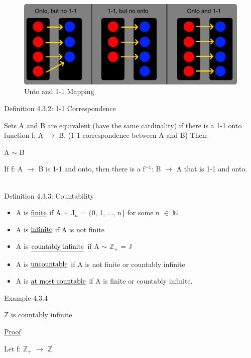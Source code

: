 \begin{figure}[h]
	\centering
	\includegraphics[scale=0.25]{Images/4.3.1.png}
	\caption{Unto and 1-1 Mapping}
\end{figure}

{ \color{blue} Definition  4.3.2: 1-1 Correspondence} 

	\begin{adjustbox}{minipage=14cm, right}
		Sets A and B are equivalent {\color{lblue} (have the same cardinality)} if there is
		a 1-1 onto function f: A $\rightarrow$ B. {\color{lblue} (1-1 correspondence between A and B)}
		Then:

		\qquad A $\sim$ B

		If f: A $\rightarrow$ B is 1-1 and onto, then
		there is a f$^{-1}$: B $\rightarrow$ A that is 1-1 and onto.
	\end{adjustbox}
\hfill \\

{ \color{blue} Definition 4.3.3: Countability } 
	\begin{itemize}[leftmargin=2cm]
		\item A is $\text{\underline{finite}}$ if A $\sim$ J$_n$ = \{0, 1, ..., n\}
			for some n $\in$ $\mathbb{N}$
		\item A is $\text{\underline{infinite}}$ if A is not finite
		\item A is $\text{\underline{countably infinite}}$ if A $\sim$ $\mathbb{Z}_+$ = J
		\item A is $\text{\underline{uncountable}}$ if A is not finite or countably infinite
		\item A is $\text{\underline{at most countable}}$ if A is finite or countably infinite.
	\end{itemize}

{ \color{purple} Example 4.3.4 } 

	\qquad $\mathbb{Z}$ is countably infinite

{ \color{magenta} \underline{Proof} } 

	Let f: $\mathbb{Z}_+$ $\rightarrow$ $\mathbb{Z}$

